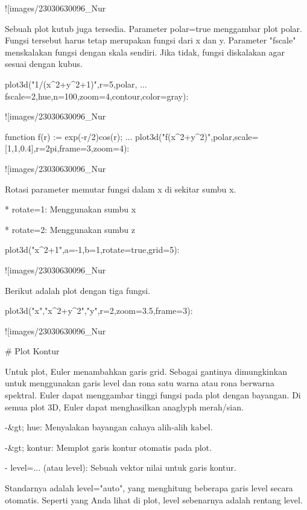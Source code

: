 \documentclass{article}
\begin{document}
![images/23030630096_Nur%

Sebuah plot kutub juga tersedia. Parameter polar=true menggambar plot
polar. Fungsi tersebut harus tetap merupakan fungsi dari x dan y.
Parameter "fscale" menskalakan fungsi dengan skala sendiri. Jika
tidak, fungsi diskalakan agar sesuai dengan kubus.


\>plot3d("1/(x^2+y^2+1)",r=5,\>polar, ...  
\>   fscale=2,\>hue,n=100,zoom=4,\>contour,color=gray):


![images/23030630096_Nur%

\>function f(r) := exp(-r/2)\*cos(r); ...  
\>   plot3d("f(x^2+y^2)",\>polar,scale=[1,1,0.4],r=2pi,frame=3,zoom=4):


![images/23030630096_Nur%

Rotasi parameter memutar fungsi dalam x di sekitar sumbu x.


* 
rotate=1: Menggunakan sumbu x

* 
rotate=2: Menggunakan sumbu z


\>plot3d("x^2+1",a=-1,b=1,rotate=true,grid=5):


![images/23030630096_Nur%

Berikut adalah plot dengan tiga fungsi.


\>plot3d("x","x^2+y^2","y",r=2,zoom=3.5,frame=3):


![images/23030630096_Nur%

# Plot Kontur

Untuk plot, Euler menambahkan garis grid. Sebagai gantinya
dimungkinkan untuk menggunakan garis level dan rona satu warna atau
rona berwarna spektral. Euler dapat menggambar tinggi fungsi pada plot
dengan bayangan. Di semua plot 3D, Euler dapat menghasilkan anaglyph
merah/sian.


-&gt; hue: Menyalakan bayangan cahaya alih-alih kabel.


-&gt; kontur: Memplot garis kontur otomatis pada plot.


- level=... (atau level): Sebuah vektor nilai untuk garis kontur.


Standarnya adalah level="auto", yang menghitung beberapa garis level
secara otomatis. Seperti yang Anda lihat di plot, level sebenarnya
adalah rentang level.
\end{document}
